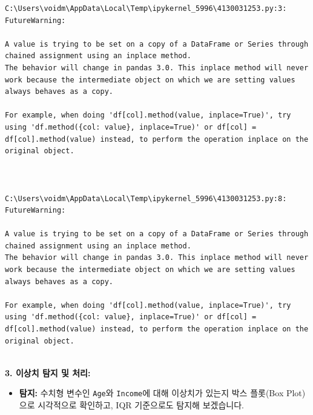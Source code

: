 \documentclass[
  letterpaper,
]{book}
\providecommand{\tightlist}{%
  \setlength{\itemsep}{0pt}\setlength{\parskip}{0pt}}
\begin{document}
\begin{verbatim}
C:\Users\voidm\AppData\Local\Temp\ipykernel_5996\4130031253.py:3: FutureWarning:

A value is trying to be set on a copy of a DataFrame or Series through chained assignment using an inplace method.
The behavior will change in pandas 3.0. This inplace method will never work because the intermediate object on which we are setting values always behaves as a copy.

For example, when doing 'df[col].method(value, inplace=True)', try using 'df.method({col: value}, inplace=True)' or df[col] = df[col].method(value) instead, to perform the operation inplace on the original object.



C:\Users\voidm\AppData\Local\Temp\ipykernel_5996\4130031253.py:8: FutureWarning:

A value is trying to be set on a copy of a DataFrame or Series through chained assignment using an inplace method.
The behavior will change in pandas 3.0. This inplace method will never work because the intermediate object on which we are setting values always behaves as a copy.

For example, when doing 'df[col].method(value, inplace=True)', try using 'df.method({col: value}, inplace=True)' or df[col] = df[col].method(value) instead, to perform the operation inplace on the original object.


\end{verbatim}

\textbf{3. 이상치 탐지 및 처리:}

\begin{itemize}
\tightlist
\item
  \textbf{탐지:} 수치형 변수인 \texttt{Age}와 \texttt{Income}에 대해
  이상치가 있는지 박스 플롯(Box Plot)으로 시각적으로 확인하고, IQR
  기준으로도 탐지해 보겠습니다.
\end{itemize}
\end{document}
